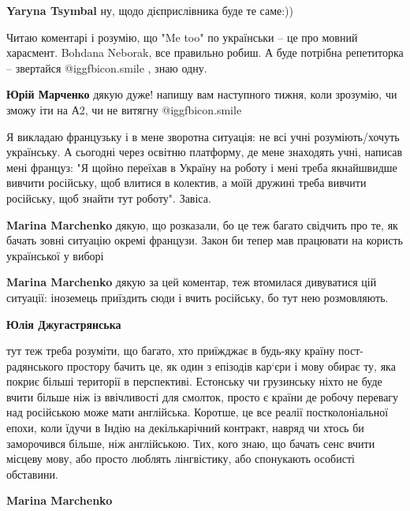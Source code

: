 \begin{itemize}
\begin{itemize}
\textbf{Yaryna Tsymbal} ну, щодо дієприслівника буде те саме:))
\end{itemize} %


Читаю коментарі і розумію, що "Me too" по українськи – це про мовний харасмент.
Bohdana Neborak, все правильно робиш. А буде потрібна репетиторка – звертайся
 @igg{fbicon.smile} , знаю одну.

 \begin{itemize} %
\textbf{Юрій Марченко} дякую дуже! напишу вам наступного тижня, коли зрозумію, чи зможу іти на А2, чи не витягну  @igg{fbicon.smile}  
 \end{itemize} %


Я викладаю французьку і в мене зворотна ситуація: не всі учні розуміють/хочуть
українську. А сьогодні через освітню платформу, де мене знаходять учні, написав
мені француз: "Я щойно переїхав в Україну на роботу і мені треба якнайшвидше
вивчити російську, щоб влитися в колектив, а моїй дружині треба вивчити
російську, щоб знайти тут роботу". Завіса.

\begin{itemize} %
\textbf{Marina Marchenko} дякую, що розказали, бо це теж багато свідчить про те, як бачать зовні ситуацію окремі французи. Закон би тепер мав працювати на користь української у виборі

\textbf{Marina Marchenko} дякую за цей коментар, теж втомилася дивуватися цій ситуації: іноземець приїздить сюди і вчить російську, бо тут нею розмовляють.

\textbf{Юлія Джугастрянська} 

тут теж треба розуміти, що багато, хто приїжджає в будь-яку країну
пост-радянського простору бачить це, як один з епізодів кар‘єри і мову обирає
ту, яка покриє більші території в перспективі. Естонську чи грузинську ніхто не
буде вчити більше ніж із ввічливості для смолток, просто є країни де робочу
перевагу над російською може мати англійська. Коротше, це все реалії
постколоніальної епохи, коли їдучи в Індію на декількарічний контракт, навряд
чи хтось би заморочився більше, ніж англійською. Тих, кого знаю, що бачать сенс
вчити місцеву мову, або просто люблять лінгвістику, або спонукають особисті
обставини.

\textbf{Marina Marchenko} 


\end{itemize}
\end{itemize}
